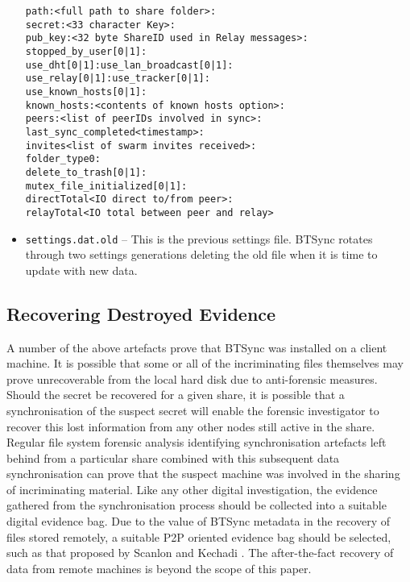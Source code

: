 \documentclass[final,5p,times,twocolumn]{elsarticle}
\begin{document}
\begin{itemize}
\texttt{path:<full path to share folder>:} \\
\texttt{secret:<33 character Key>:} \\
\texttt{pub\_key:<32 byte ShareID used in Relay messages>:} \\
\texttt{stopped\_by\_user[0|1]:} \\
\texttt{use\_dht[0|1]:use\_lan\_broadcast[0|1]:} \\
\texttt{use\_relay[0|1]:use\_tracker[0|1]:} \\
\texttt{use\_known\_hosts[0|1]:} \\
\texttt{known\_hosts:<contents of known hosts option>:} \\
\texttt{peers:<list of peerIDs involved in sync>:} \\
\texttt{last\_sync\_completed<timestamp>:} \\
\texttt{invites<list of swarm invites received>:} \\
\texttt{folder\_type0:} \\
\texttt{delete\_to\_trash[0|1]:} \\
\texttt{mutex\_file\_initialized[0|1]:} \\
\texttt{directTotal<IO direct to/from peer>:} \\
\texttt{relayTotal<IO total between peer and relay>} \\

\item \texttt{settings.dat.old} -- This is the previous settings file. BTSync rotates through two settings generations deleting the old file when it is time to update with new data.
\end{itemize}

\subsection{Recovering Destroyed Evidence}
\label{deb}

A number of the above artefacts prove that BTSync was installed on a client machine. It is possible that some or all of the incriminating files themselves may prove unrecoverable from the local hard disk due to anti-forensic measures. Should the secret be recovered for a given share, it is possible that a synchronisation of the suspect secret will enable the forensic investigator to recover this lost information from any other nodes still active in the share. Regular file system forensic analysis identifying synchronisation artefacts left behind from a particular share combined with this subsequent data synchronisation can prove that the suspect machine was involved in the sharing of incriminating material. Like any other digital investigation, the evidence gathered from the synchronisation process should be collected into a suitable digital evidence bag. Due to the value of BTSync metadata in the recovery of files stored remotely, a suitable P2P oriented evidence bag should be selected, such as that proposed by Scanlon and Kechadi \cite{scanlon2014digital}. The after-the-fact recovery of data from remote machines is beyond the scope of this paper.
\end{document}
